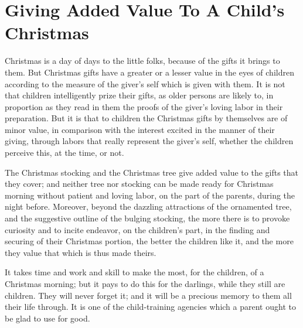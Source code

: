 \documentclass[
]{book}
\begin{document}
\hypertarget{giving-added-value-to-a-childs-christmas}{%
\chapter{Giving Added Value To A Child's Christmas}\label{giving-added-value-to-a-childs-christmas}}

Christmas is a day of days to the little folks, because of the gifts it brings to them. But Christmas gifts have a greater or a lesser value in the eyes of children according to the measure of the giver's self which is given with them. It is not that children intelligently prize their gifts, as older persons are likely to, in proportion as they read in them the proofs of the giver's loving labor in their preparation. But it is that to children the Christmas gifts by themselves are of minor value, in comparison with the interest excited in the manner of their giving, through labors that really represent the giver's self, whether the children perceive this, at the time, or not.

The Christmas stocking and the Christmas tree give added value to the gifts that they cover; and neither tree nor stocking can be made ready for Christmas morning without patient and loving labor, on the part of the parents, during the night before. Moreover, beyond the dazzling attractions of the ornamented tree, and the suggestive outline of the bulging stocking, the more there is to provoke curiosity and to incite endeavor, on the children's part, in the finding and securing of their Christmas portion, the better the children like it, and the more they value that which is thus made theirs.

It takes time and work and skill to make the most, for the children, of a Christmas morning; but it pays to do this for the darlings, while they still are children. They will never forget it; and it will be a precious memory to them all their life through. It is one of the child-training agencies which a parent ought to be glad to use for good.
\end{document}
